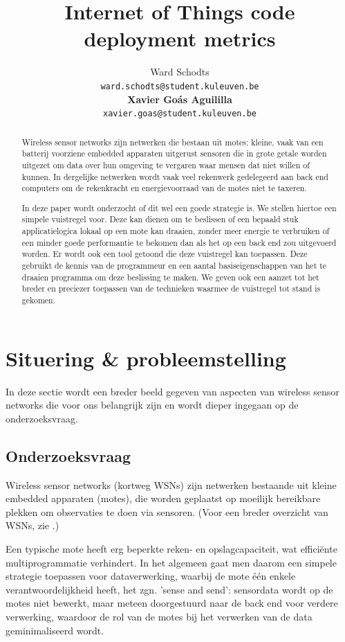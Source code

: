 \documentclass[11pt]{article}
\title{Internet of Things code deployment metrics}
\author{
  Ward Schodts\\
  \texttt{ward.schodts@student.kuleuven.be}
  \\[3ex]
  \textbf{Xavier Go\'as Aguililla}\\
  \texttt{xavier.goas@student.kuleuven.be}
}
\begin{document}
\maketitle

\listoftodos
\linespread{1.3}
\begin{abstract}
Wireless sensor networks zijn netwerken die bestaan uit motes: kleine, vaak van
een batterij voorziene embedded apparaten uitgerust sensoren die in grote
getale worden uitgezet om data over hun omgeving te vergaren waar mensen dat
niet willen of kunnen. In dergelijke netwerken wordt vaak veel rekenwerk
gedelegeerd aan back end computers om de rekenkracht en energievoorraad van de
motes niet te taxeren. 

In deze paper wordt onderzocht of dit wel een goede strategie is. We stellen
hiertoe een simpele vuistregel voor. Deze kan dienen om te beslissen of een
bepaald stuk applicatielogica lokaal op een mote kan draaien, zonder meer
energie te verbruiken of een minder goede performantie te bekomen dan als het op een
back end zou uitgevoerd worden. Er wordt ook een tool getoond die deze vuistregel
kan toepassen. Deze gebruikt de kennis van de programmeur en een aantal
basiseigenschappen van het te draaien programma om deze beslissing te maken. We
geven ook een aanzet tot het breder en preciezer toepassen van de technieken
waarmee de vuistregel tot stand is gekomen.
  
\end{abstract}

\section{Situering \& probleemstelling}

In deze sectie wordt een breder beeld gegeven van aspecten van wireless
sensor networks die voor ons belangrijk zijn en wordt dieper ingegaan op de
onderzoeksvraag.

\subsection{Onderzoeksvraag}

Wireless sensor networks (kortweg WSNs) zijn netwerken bestaande uit kleine
embedded apparaten (motes), die worden geplaatst op moeilijk bereikbare plekken
om observaties te doen via sensoren. (Voor een breder overzicht van
WSNs, zie \cite{akyildiz2002wireless}.)

Een typische mote heeft erg beperkte reken- en opslagcapaciteit, wat
effici\"ente multiprogrammatie verhindert. In het algemeen gaat men daarom een
simpele strategie toepassen voor dataverwerking, waarbij de mote \'e\'en enkele
verantwoordelijkheid heeft, het zgn. 'sense and send': sensordata wordt op de
motes niet bewerkt, maar meteen doorgestuurd naar de back end voor verdere
verwerking, waardoor de rol van de motes bij het verwerken van de data
geminimaliseerd wordt.
\end{document}
